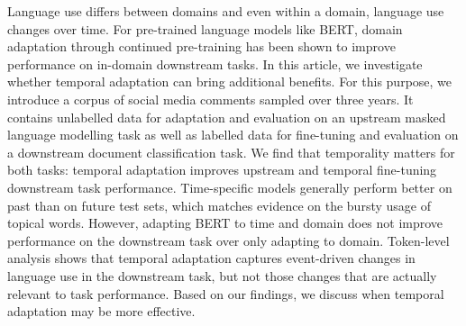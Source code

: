 Language use differs between domains and even within a domain, language use changes over time. For pre-trained language models like BERT, domain adaptation through continued pre-training has been shown to improve performance on in-domain downstream tasks. In this article, we investigate whether temporal adaptation can bring additional benefits. For this purpose, we introduce a corpus of social media comments sampled over three years. It contains unlabelled data for adaptation and evaluation on an upstream masked language modelling task as well as labelled data for fine-tuning and evaluation on a downstream document classification task. We find that temporality matters for both tasks: temporal adaptation improves upstream and temporal fine-tuning downstream task performance. Time-specific models generally perform better on past than on future test sets, which matches evidence on the bursty usage of topical words. However, adapting BERT to time and domain does not improve performance on the downstream task over only adapting to domain. Token-level analysis shows that temporal adaptation captures event-driven changes in language use in the downstream task, but not those changes that are actually relevant to task performance. Based on our findings, we discuss when temporal adaptation may be more effective.

